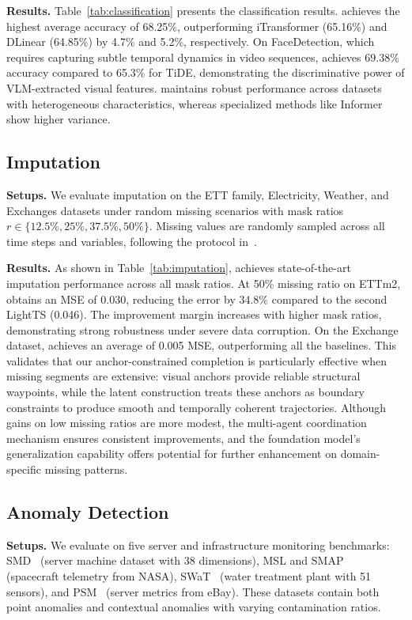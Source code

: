 \noindent\textbf{Results.} Table~\ref{tab:classification} presents the classification results. \model achieves the highest average accuracy of 68.25\%, outperforming iTransformer (65.16\%) and DLinear (64.85\%) by 4.7\% and 5.2\%, respectively. On FaceDetection, which requires capturing subtle temporal dynamics in video sequences, \model achieves 69.38\% accuracy compared to 65.3\% for TiDE, demonstrating the discriminative power of VLM-extracted visual features. \model maintains robust performance across datasets with heterogeneous characteristics, whereas specialized methods like Informer show higher variance.

\subsection{Imputation}
\noindent\textbf{Setups.} We evaluate imputation on the ETT family, Electricity, Weather, and Exchanges datasets under random missing scenarios with mask ratios $r \in \{12.5\%, 25\%, 37.5\%, 50\%\}$. Missing values are randomly sampled across all time steps and variables, following the protocol in~\cite{wu2023timesnet}.

\noindent\textbf{Results.} As shown in Table~\ref{tab:imputation}, \model achieves state-of-the-art imputation performance across all mask ratios. 
At 50\% missing ratio on ETTm2, \model obtains an MSE of 0.030, reducing the error by 34.8\% compared to the second LightTS (0.046). 
The improvement margin increases with higher mask ratios, demonstrating strong robustness under severe data corruption.
On the Exchange dataset, \model achieves an average of 0.005 MSE, outperforming all the baselines.
This validates that our anchor-constrained completion is particularly effective when missing segments are extensive: visual anchors provide reliable structural waypoints, while the latent construction treats these anchors as boundary constraints to produce smooth and temporally coherent trajectories. 
Although gains on low missing ratios are more modest, the multi-agent coordination mechanism ensures consistent improvements, and the foundation model's generalization capability offers potential for further enhancement on domain-specific missing patterns.

\subsection{Anomaly Detection}
\noindent\textbf{Setups.} We evaluate on five server and infrastructure monitoring benchmarks: SMD~\cite{su2019robust} (server machine dataset with 38 dimensions), MSL and SMAP~\cite{hundman2018detecting} (spacecraft telemetry from NASA), SWaT~\cite{mathur2016swat} (water treatment plant with 51 sensors), and PSM~\cite{abdulaal2021practical} (server metrics from eBay).
These datasets contain both point anomalies and contextual anomalies with varying contamination ratios.

